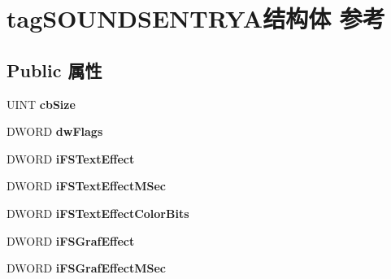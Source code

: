 \hypertarget{structtag_s_o_u_n_d_s_e_n_t_r_y_a}{}\section{tag\+S\+O\+U\+N\+D\+S\+E\+N\+T\+R\+Y\+A结构体 参考}
\label{structtag_s_o_u_n_d_s_e_n_t_r_y_a}
\subsection*{Public 属性}
\begin{DoxyCompactItemize}
\item 
\mbox{\label{structtag_s_o_u_n_d_s_e_n_t_r_y_a_ae3a31d69fa4840c9c8ff0d9e8cc4aadb}} 
U\+I\+NT {\bfseries cb\+Size}
\item 
\mbox{\label{structtag_s_o_u_n_d_s_e_n_t_r_y_a_ae98d222a93a947e740b608c5fd5ac87f}} 
D\+W\+O\+RD {\bfseries dw\+Flags}
\item 
\mbox{\label{structtag_s_o_u_n_d_s_e_n_t_r_y_a_a33658c1d8be28e0124cb3b0c04342885}} 
D\+W\+O\+RD {\bfseries i\+F\+S\+Text\+Effect}
\item 
\mbox{\label{structtag_s_o_u_n_d_s_e_n_t_r_y_a_a80b38ad4027e863d5b3cabf368b7406c}} 
D\+W\+O\+RD {\bfseries i\+F\+S\+Text\+Effect\+M\+Sec}
\item 
\mbox{\label{structtag_s_o_u_n_d_s_e_n_t_r_y_a_a317c2e6a0f7fb18231439b97c6a35ebe}} 
D\+W\+O\+RD {\bfseries i\+F\+S\+Text\+Effect\+Color\+Bits}
\item 
\mbox{\label{structtag_s_o_u_n_d_s_e_n_t_r_y_a_ab554bb11e2bb9ab785257a6e11d9af9c}} 
D\+W\+O\+RD {\bfseries i\+F\+S\+Graf\+Effect}
\item 
\mbox{\label{structtag_s_o_u_n_d_s_e_n_t_r_y_a_a9362c74e49700bc89f5baf16b48309d3}} 
D\+W\+O\+RD {\bfseries i\+F\+S\+Graf\+Effect\+M\+Sec}
\item 
\mbox{\label{structtag_s_o_u_n_d_s_e_n_t_r_y_a_a71c4152d4884a3d065d3761e965b5a79}} 

\end{DoxyCompactItemize}

